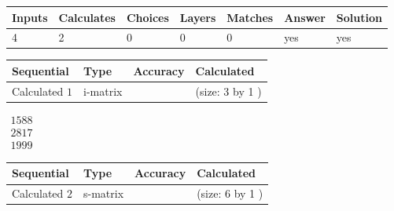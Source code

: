 \documentclass[12pt]{article}
\begin{document}
 
 
\noindent{}
 
 

 
 
 
\noindent{}
 
 

 
 
\noindent{}
 
 

 
\vspace{0.3in}
   
   
   
   
\noindent\begin{tabular}{|l|l|l|l|l|l|l|}
 \hline
Inputs & Calculates & Choices & Layers & Matches & Answer & Solution \\ \hline
 4  & 
 2  & 
 0
  & 
 0  & 
 0  & 
  yes & 
  yes 
  \\ \hline
 \end{tabular}
   
   
   
   
\noindent{}
   
   
  
  
\noindent\begin{tabular}{|l|l|l|l|}
\hline
 Sequential & Type & Accuracy & Calculated \\ 
\hline
 
 
  Calculated $  1 $ & i-matrix &  & 
 (size:  3  by  1 )
 \\  \hline  
 \end{tabular}
   
   
$\begin{array}{
 c
 }
 1588  \\ 
 2817  \\ 
 1999
 \end{array}  $ 
  
  
\noindent\begin{tabular}{|l|l|l|l|}
\hline
 Sequential & Type & Accuracy & Calculated \\ 
\hline
 
 
  Calculated $  2 $ & s-matrix & & 
 (size:  6  by  1 )
 \\  \hline  
 \end{tabular}
   
\end{document}

